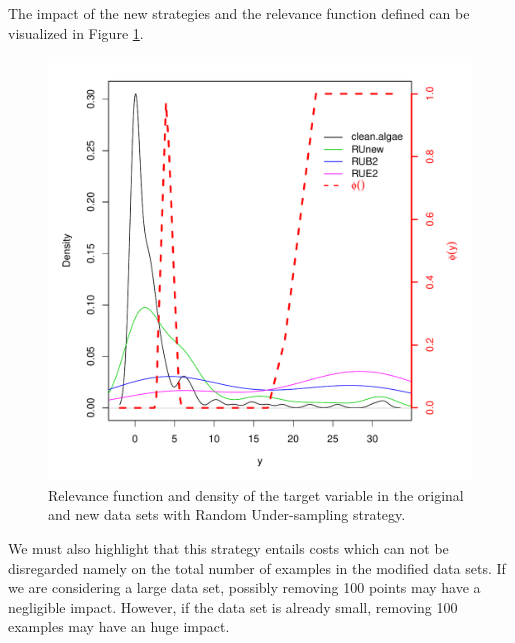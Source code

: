 \documentclass[10pt,a4paper]{article}\usepackage[]{graphicx}\usepackage[]{color}
\makeatletter
\def\maxwidth{ %
  \ifdim\Gin@nat@width>\linewidth
    \linewidth
  \else
    \Gin@nat@width
  \fi
}
\newenvironment{knitrout}{}{} %
\makeatother
\begin{document}
The impact of the new strategies and the relevance function defined can be visualized in Figure \ref{fig:RU_ex2}.

\begin{knitrout}\footnotesize
{}\color{fgcolor}\begin{figure}

{\centering \includegraphics[width=\maxwidth]{figures/UBL-RU_ex2-1} 

}

\caption[Relevance function and density of the target variable in the original and new data sets with Random Under-sampling strategy]{Relevance function and density of the target variable in the original and new data sets with Random Under-sampling strategy.}\label{fig:RU_ex2}
\end{figure}


\end{knitrout}

We must also highlight that this strategy entails costs which can not be disregarded namely on the total number of examples in the modified data sets. If we are considering a large data set, possibly removing 100 points may have a negligible impact. However, if the data set is already small, removing 100 examples may have an huge impact. 
\end{document}
